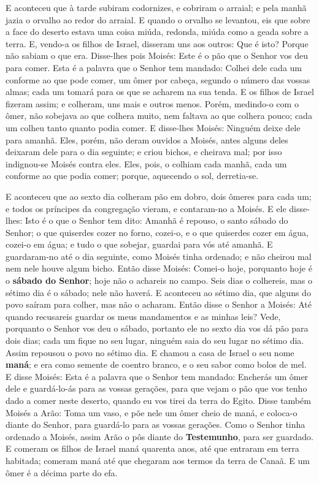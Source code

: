 E aconteceu que à tarde subiram codornizes, e cobriram o arraial;
e pela manhã jazia o orvalho ao redor do arraial. E quando o
orvalho se levantou, eis que sobre a face do deserto estava uma
coisa miúda, redonda, miúda como a geada sobre a terra. E,
vendo-a os filhos de Israel, disseram uns aos outros: Que é isto?
Porque não sabiam o que era. Disse-lhes pois Moisés: Este é o pão
que o Senhor vos deu para comer. Esta é a palavra que o
Senhor tem mandado: Colhei dele cada um conforme ao que pode comer,
um ômer por cabeça, segundo o número das vossas almas; cada um
tomará para os que se acharem na sua tenda. E os filhos de
Israel fizeram assim; e colheram, uns mais e outros menos.
Porém, medindo-o com o ômer, não sobejava ao que colhera
muito, nem faltava ao que colhera pouco; cada um colheu tanto quanto
podia comer. E disse-lhes Moisés: Ninguém deixe dele para
amanhã. Eles, porém, não deram ouvidos a Moisés, antes alguns
deles deixaram dele para o dia seguinte; e criou bichos, e cheirava
mal; por isso indignou-se Moisés contra eles. Eles, pois, o
colhiam cada manhã, cada um conforme ao que podia comer; porque,
aquecendo o sol, derretia-se.

E aconteceu que ao sexto dia colheram pão em dobro, dois ômeres
para cada um; e todos os príncipes da congregação vieram, e
contaram-no a Moisés. E ele disse-lhes: Isto é o que o Senhor
tem dito: Amanhã é repouso, o santo sábado do Senhor; o que
quiserdes cozer no forno, cozei-o, e o que quiserdes cozer em água,
cozei-o em água; e tudo o que sobejar, guardai para vós até amanhã.
E guardaram-no até o dia seguinte, como Moisés tinha
ordenado; e não cheirou mal nem nele houve algum bicho. Então
disse Moisés: Comei-o hoje, porquanto hoje é o \textbf{sábado do
Senhor}; hoje não o achareis no campo. Seis dias o colhereis,
mas o sétimo dia é o sábado; nele não haverá. E aconteceu ao
sétimo dia, que alguns do povo saíram para colher, mas não o
acharam. Então disse o Senhor a Moisés: Até quando recusareis
guardar os meus mandamentos e as minhas leis? Vede, porquanto
o Senhor vos deu o sábado, portanto ele no sexto dia vos dá pão para
dois dias; cada um fique no seu lugar, ninguém saia do seu lugar no
sétimo dia. Assim repousou o povo no sétimo dia. E
chamou a casa de Israel o seu nome \textbf{maná}; e era como semente
de coentro branco, e o seu sabor como bolos de mel. E disse
Moisés: Esta é a palavra que o Senhor tem mandado: Encherás um ômer
dele e guardá-lo-ás para as vossas gerações, para que vejam o pão
que vos tenho dado a comer neste deserto, quando eu vos tirei da
terra do Egito. Disse também Moisés a Arão: Toma um vaso, e
põe nele um ômer cheio de maná, e coloca-o diante do Senhor, para
guardá-lo para as vossas gerações. Como o Senhor tinha
ordenado a Moisés, assim Arão o pôs diante do \textbf{Testemunho},
para ser guardado. E comeram os filhos de Israel maná
quarenta anos, até que entraram em terra habitada; comeram maná até
que chegaram aos termos da terra de Canaã. E um ômer é a
décima parte do efa.

